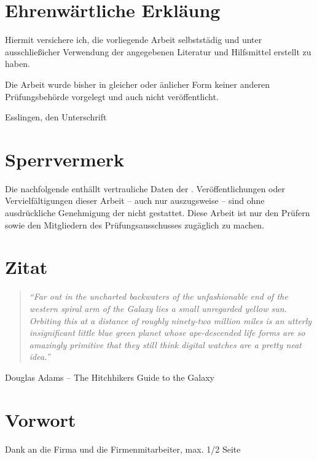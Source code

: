 \chapter*{Ehrenwärtliche Erkläung}

Hiermit versichere ich, die vorliegende Arbeit selbststädig und unter ausschließicher Verwendung der angegebenen Literatur und Hilfsmittel erstellt zu haben.

Die Arbeit wurde bisher in gleicher oder änlicher Form keiner anderen Prüfungsbehörde vorgelegt und auch nicht veröffentlicht.

\hrulefill

Esslingen, den \workDate \hspace*{\fill} Unterschrift


\newpage
%
\chapter*{Sperrvermerk} %

Die nachfolgende \workType enthällt vertrauliche Daten der \workComany.
Veröffentlichungen oder Vervielfältigungen dieser Arbeit -- auch nur auszugsweise -- sind ohne ausdrückliche Genehmigung der \workComany nicht gestattet.
Diese Arbeit ist nur den Prüfern sowie den Mitgliedern des Prüfungsausschusses zugäglich zu machen.
\newpage
%
\chapter*{Zitat} %
\begin{center}
\begin{minipage}{12cm}
\begin{quotation}
\textit{\enquote{Far out in the uncharted backwaters of the unfashionable
end of the western spiral arm of the Galaxy lies a small unregarded
yellow sun. Orbiting this at a distance of roughly ninety-two
million miles is an utterly insignificant little blue green planet
whose ape-descended life forms are so amazingly primitive that they
still think digital watches are a pretty neat idea.}}
\end{quotation}
\hfill \textsf Douglas Adams -- The Hitchhikers Guide to the Galaxy
\end{minipage}
\end{center}
\newpage{}
\chapter*{Vorwort} %

Dank an die Firma und die Firmenmitarbeiter, max. 1/2 Seite

\newpage
